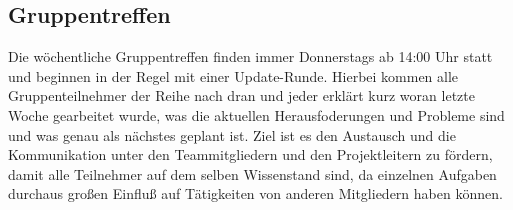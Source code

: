 \subsection{Gruppentreffen}
Die wöchentliche Gruppentreffen finden immer Donnerstags ab 14:00 Uhr statt und beginnen in der Regel mit einer Update-Runde. Hierbei kommen alle Gruppenteilnehmer der Reihe nach dran und jeder erklärt kurz woran letzte Woche gearbeitet wurde, was die aktuellen Herausfoderungen und Probleme sind und was genau als nächstes geplant ist. Ziel ist es den Austausch und die Kommunikation unter den Teammitgliedern und den Projektleitern zu fördern, damit alle Teilnehmer auf dem selben Wissenstand sind, da einzelnen Aufgaben durchaus großen Einfluß auf Tätigkeiten von anderen Mitgliedern haben können. \\